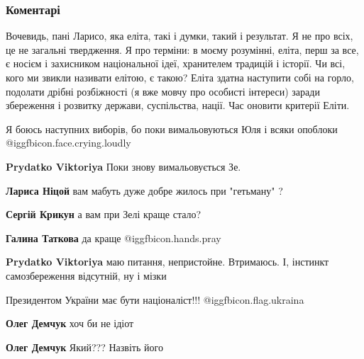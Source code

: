  
 
 
 
 
\subsubsection{Коментарі}

\begin{itemize} %

Вочевидь, пані Ларисо, яка еліта, такі і думки, такий і результат. Я не про
всіх, це не загальні твердження. Я про терміни: в моєму розумінні, еліта, перш
за все, є носієм і захисником національної ідеї, хранителем традицій і історії.
Чи всі, кого ми звикли називати елітою, є такою? Еліта здатна наступити собі на
горло, подолати дрібні розбіжності (я вже мовчу про особисті інтереси) заради
збереження і розвитку держави, суспільства, нації. Час оновити критерії Еліти.

Я боюсь наступних виборів, бо поки вимальовуються Юля і всяки опоблоки  @igg{fbicon.face.crying.loudly} 

\begin{itemize} %
\textbf{Prydatko Viktoriya} Поки знову вимальовується Зе.

\textbf{Лариса Ніцой} вам мабуть дуже добре жилось при "гетьману" ?

\textbf{Сергій Крикун} а вам при Зелі краще стало?

\textbf{Галина Таткова} да краще  @igg{fbicon.hands.pray} 

\textbf{Prydatko Viktoriya} маю питання, непристойне. Втримаюсь. І, інстинкт самозбереження відсутній, ну і мізки
\end{itemize} %

Президентом України має бути націоналіст!!! @igg{fbicon.flag.ukraina}

\begin{itemize} %
\textbf{Олег Демчук} хоч би не ідіот

\textbf{Олег Демчук} Який??? Назвіть його


\end{itemize}
\end{itemize}
